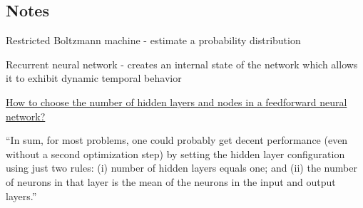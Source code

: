 \documentclass[10pt]{amsart}
\begin{document}
\begin{multicols*}{2}
\part{Notes}


Restricted Boltzmann machine - estimate a probability distribution

Recurrent neural network - creates an internal state of the network which allows it to exhibit dynamic temporal behavior


\href{http://stats.stackexchange.com/questions/181/how-to-choose-the-number-of-hidden-layers-and-nodes-in-a-feedforward-neural-netw}{How to choose the number of hidden layers and nodes in a feedforward neural network?}

``In sum, for most problems, one could probably get decent performance (even without a second optimization step) by setting the hidden layer configuration using just two rules: (i) number of hidden layers equals one; and (ii) the number of neurons in that layer is the mean of the neurons in the input and output layers.''







\end{multicols*}
\end{document}
